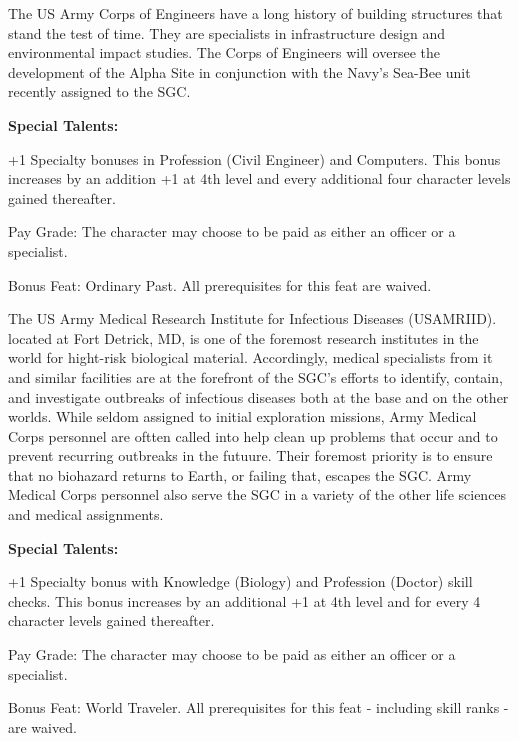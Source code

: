 The US Army Corps of Engineers have a long history of building structures that stand the test of time.  They are specialists in infrastructure design and  environmental impact studies.  The Corps of Engineers will oversee the development of the Alpha Site in conjunction with the Navy’s Sea-Bee unit recently assigned to the SGC.

\textbf{Special Talents:}
\begin{itemize*}
\item +1 Specialty bonuses in Profession (Civil Engineer) and Computers. This bonus increases by an addition +1 at 4th level and every additional four character levels gained thereafter.
\item Pay Grade: The character may choose to be paid as either an officer or a specialist.
\item Bonus Feat: Ordinary Past. All prerequisites for this feat are waived.
\end{itemize*}

The US Army Medical Research Institute for Infectious Diseases (USAMRIID). located at Fort Detrick, MD, is one of the foremost research institutes in the world for hight-risk biological material. Accordingly, medical specialists from it and similar facilities are at the forefront of the SGC's efforts to identify, contain, and investigate outbreaks of infectious diseases both at the base and on the other worlds. While seldom assigned to initial exploration missions, Army Medical Corps personnel are oftten called into help clean up problems that occur and to prevent recurring outbreaks in the futuure. Their foremost priority is to ensure that no biohazard returns to Earth, or failing that, escapes the SGC. Army Medical Corps personnel also serve the SGC in a variety of the other life sciences and medical assignments.

\textbf{Special Talents:}
\begin{itemize*}
\item +1 Specialty bonus with Knowledge (Biology) and Profession (Doctor) skill checks. This bonus increases by an additional +1 at 4th level and for every 4 character levels gained thereafter.
\item Pay Grade: The character may choose to be paid as either an officer or a specialist.
\item Bonus Feat: World Traveler. All prerequisites for this feat - including skill ranks - are waived.
\end{itemize*}

